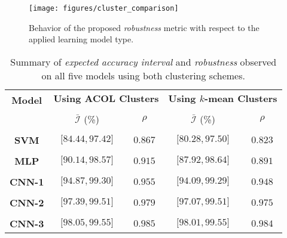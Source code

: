 \documentclass[letterpaper]{article}
\begin{document}
\begin{figure}[t]
	\begin{center}
		\centerline{\texttt{[image: figures/cluster\_comparison]}}
		\caption{Behavior of the proposed \textit{robustness} metric with respect to the applied learning model type.}
		\label{fig:comparison}
	\end{center}
	\vskip -0.2in
\end{figure}


\begin{table}[ht]
	\begin{center}
		\caption{Summary of \textit{expected accuracy interval} and \textit{robustness} observed on all five models using both clustering schemes.}
		\label{tab:model_sum}
		\resizebox{\columnwidth}{!} {
			\begin{tabular}{ c|cc|cc }
				\multirow{2}{*}{\textbf{Model}} & \multicolumn{2}{c|}{\textbf{Using ACOL Clusters}} & \multicolumn{2}{c}{\textbf{Using $k$-mean Clusters}} \\ \cline{2-5} 
								& 							& 		  & 						&	\\[-0.9em] 				
								& $\bar{\mathcal{I}}$ (\%)  & $\rho$  & $\bar{\mathcal{I}}$ (\%)& $\rho$\\ \hline%
								& 							& 		  & 						&	    \\[-0.9em] 
				\textbf{SVM} 	&	$\big[84.44,97.42\big]$ & $0.867$ &	$\big[80.28,97.50\big]$ & $0.823$\\ %
								& 							& 		  & 						&	    \\[-0.9em] 
				\textbf{MLP} 	& 	$\big[90.14,98.57\big]$ & $0.915$ &	$\big[87.92,98.64\big]$ & $0.891$\\ %
								& 							& 		  & 						&	    \\[-0.9em] 
				\textbf{CNN-1} 	& 	$\big[94.87,99.30\big]$ & $0.955$ &	$\big[94.09,99.29\big]$ & $0.948$\\ %
								& 							& 		  & 						&	    \\[-0.9em] 
				\textbf{CNN-2} 	& 	$\big[97.39,99.51\big]$ & $0.979$ &	$\big[97.07,99.51\big]$ & $0.975$\\ %
								& 							& 		  & 						&	    \\[-0.9em] 
				\textbf{CNN-3} 	& 	$\big[98.05,99.55\big]$ & $0.985$ &	$\big[98.01,99.55\big]$ & $0.984$\\ %
				
			\end{tabular}
		}
	\end{center}
\end{table}
\end{document}
